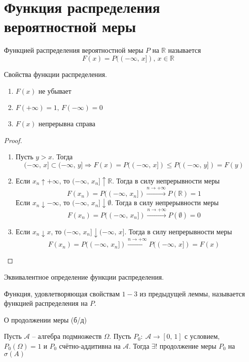 \section{Функция распределения вероятностной меры}
\begin{definition}
	Функцией распределения вероятностной меры $P$ на $\mathbb{R}$ называется
	\[F(x) = P((-\infty,\, x]),\, x \in \mathbb{R}\]
\end{definition}

\begin{lemma}
	Свойства функции распределения.

	\begin{enumerate}
		\item $F(x)$ не убывает
		\item $F(+\infty) = 1,\, F(-\infty) = 0$
		\item $F(x)$ непрерывна справа
	\end{enumerate}
\end{lemma}

\begin{proof}
	\begin{enumerate}
		\item Пусть $y > x$. Тогда
		      \[(-\infty,\, x] \subset (-\infty,\, y] \Rightarrow F(x) = P((-\infty,\, x]) \leq P((-\infty,\, y]) = F(y)\]
		\item Если $x_n \uparrow +\infty$, то $(-\infty,\, x_n] \uparrow \mathbb{R}$. Тогда в силу непрерывности меры
		      \[F(x_n) = P((-\infty,\, x_n]) \stackrel{n \to +\infty}{\to} P(\mathbb{R}) = 1\]
		      Если $x_n \downarrow -\infty$, то $(-\infty,\, x_n] \downarrow \emptyset$. Тогда в силу непрерывности меры
		      \[F(x_n) = P((-\infty,\, x_n]) \stackrel{n \to +\infty}{\to} P(\emptyset) = 0\]
		\item Если $x_n \downarrow x$, то $(-\infty,\, x_n] \downarrow (-\infty,\, x]$. Тогда в силу непрерывности меры
		      \[F(x_n) = P((-\infty,\, x_n]) \stackrel{n \to +\infty}{\to} P((-\infty,\, x]) = F(x)\]
	\end{enumerate}
\end{proof}

\begin{definition}
	Эквивалентное определение функции распределения.

	Функция, удовлетворяющая свойствам $1-3$ из предыдущей леммы, называется функцией распределения на $P$.
\end{definition}

\begin{theorem} \label{MEASURE_EXTEND_TH}
	О продолжении меры (б/д)

	Пусть $\mathcal{A}$ -- алгебра подмножеств $\Omega$. Пусть $P_0 :\: \mathcal{A} \to [0,\,1]$ с условием, $P_0(\Omega) = 1$ и $P_0$ счётно-аддитивна на $\mathcal{A}$. Тогда $\exists!$ продолжение меры $P_0$ на $\sigma(A)$
\end{theorem}

